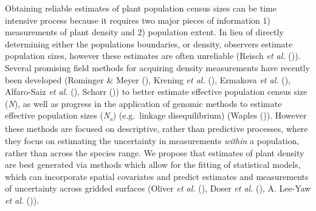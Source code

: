 \documentclass[
]{article}
\begin{document}
Obtaining reliable estimates of plant population census sizes can be
time intensive process because it requires two major pieces of
information 1) measurements of plant density and 2) population extent.
In lieu of directly determining either the populations boundaries, or
density, observers estimate population sizes, however these estimates
are often unreliable (Reisch \emph{et al.}
()). Several promising field
methods for acquiring density measurements have recently been developed
(Rominger \& Meyer (),
Krening \emph{et al.} (),
Ermakova \emph{et al.} (),
Alfaro-Saiz \emph{et al.} (),
Schorr ()) to better estimate
effective population census size (\emph{N}), as well as progress in the
application of genomic methods to estimate effective population sizes
(\emph{N\textsubscript{e}}) (e.g.~linkage disequilibrium) (Waples
()). However these methods are
focused on descriptive, rather than predictive processes, where they
focus on estimating the uncertainty in measurements \emph{within} a
population, rather than across the species range. We propose that
estimates of plant density are best generated via methods which allow
for the fitting of statistical models, which can incorporate spatial
covariates and predict estimates and measurements of uncertainty across
gridded surfaces (Oliver \emph{et al.}
(), Doser \emph{et al.}
(), A. Lee-Yaw \emph{et al.}
()).
\end{document}

